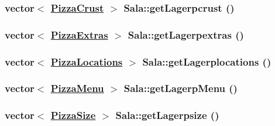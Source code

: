 \hypertarget{class_sala_85a631cad1f4009e87de7da3bc52174c}{
\subsubsection[getLagerpcrust]{\setlength{\rightskip}{0pt plus 5cm}vector$<$ \hyperlink{class_pizza_crust}{Pizza\-Crust} $>$ Sala::get\-Lagerpcrust ()}}
\label{class_sala_85a631cad1f4009e87de7da3bc52174c}


\hypertarget{class_sala_49f231948b80188691882a8624a4612d}{
\subsubsection[getLagerpextras]{\setlength{\rightskip}{0pt plus 5cm}vector$<$ \hyperlink{class_pizza_extras}{Pizza\-Extras} $>$ Sala::get\-Lagerpextras ()}}
\label{class_sala_49f231948b80188691882a8624a4612d}


\hypertarget{class_sala_1e720a42845186f5057b36ab8b69711a}{
\subsubsection[getLagerplocations]{\setlength{\rightskip}{0pt plus 5cm}vector$<$ \hyperlink{class_pizza_locations}{Pizza\-Locations} $>$ Sala::get\-Lagerplocations ()}}
\label{class_sala_1e720a42845186f5057b36ab8b69711a}


\hypertarget{class_sala_89b38b3e2a9835524c9fd21628f485cc}{
\subsubsection[getLagerpMenu]{\setlength{\rightskip}{0pt plus 5cm}vector$<$ \hyperlink{class_pizza_menu}{Pizza\-Menu} $>$ Sala::get\-Lagerp\-Menu ()}}
\label{class_sala_89b38b3e2a9835524c9fd21628f485cc}


\hypertarget{class_sala_3b0fc00a14ac87f5c78a4ec2f508d67b}{
\subsubsection[getLagerpsize]{\setlength{\rightskip}{0pt plus 5cm}vector$<$ \hyperlink{class_pizza_size}{Pizza\-Size} $>$ Sala::get\-Lagerpsize ()}}
\label{class_sala_3b0fc00a14ac87f5c78a4ec2f508d67b}


